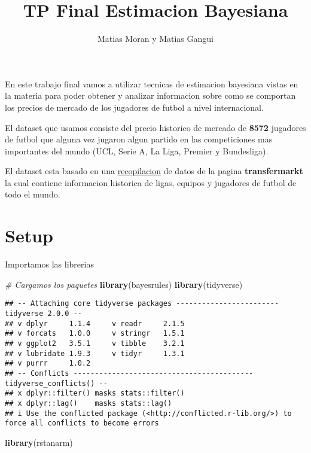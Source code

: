 \documentclass[
]{article}
\title{TP Final Estimacion Bayesiana}
\subtitle{Matias Moran y Matias Gangui}
\author{}
\date{\vspace{-2.5em}}
\newenvironment{Shaded}{\begin{snugshade}}{\end{snugshade}}
\newcommand{\CommentTok}[1]{\textcolor[rgb]{0.56,0.35,0.01}{\textit{#1}}}
\newcommand{\FunctionTok}[1]{\textcolor[rgb]{0.13,0.29,0.53}{\textbf{#1}}}
\newcommand{\NormalTok}[1]{#1}
\begin{document}
\maketitle

En este trabajo final vamos a utilizar tecnicas de estimacion bayesiana
vistas en la materia para poder obtener y analizar informacion sobre
como se comportan los precios de mercado de los jugadores de futbol a
nivel internacional.

El dataset que usamos consiste del precio historico de mercado de
\textbf{8572} jugadores de futbol que alguna vez jugaron algun partido
en las competiciones mas importantes del mundo (UCL, Serie A, La Liga,
Premier y Bundesliga).

El dataset esta basado en una
\href{https://www.kaggle.com/datasets/davidcariboo/player-scores}{recopilacion}
de datos de la pagina \textbf{transfermarkt} la cual contiene
informacion historica de ligas, equipos y jugadores de futbol de todo el
mundo.

\section{Setup}\label{setup}

Importamos las librerias

\begin{Shaded}
\begin{Highlighting}[]
\CommentTok{\# Cargamos los paquetes}
\FunctionTok{library}\NormalTok{(bayesrules)}
\FunctionTok{library}\NormalTok{(tidyverse)}
\end{Highlighting}
\end{Shaded}

\begin{verbatim}
## -- Attaching core tidyverse packages ------------------------ tidyverse 2.0.0 --
## v dplyr     1.1.4     v readr     2.1.5
## v forcats   1.0.0     v stringr   1.5.1
## v ggplot2   3.5.1     v tibble    3.2.1
## v lubridate 1.9.3     v tidyr     1.3.1
## v purrr     1.0.2     
## -- Conflicts ------------------------------------------ tidyverse_conflicts() --
## x dplyr::filter() masks stats::filter()
## x dplyr::lag()    masks stats::lag()
## i Use the conflicted package (<http://conflicted.r-lib.org/>) to force all conflicts to become errors
\end{verbatim}

\begin{Shaded}
\begin{Highlighting}[]
\FunctionTok{library}\NormalTok{(rstanarm)}
\end{Highlighting}
\end{Shaded}
\end{document}
